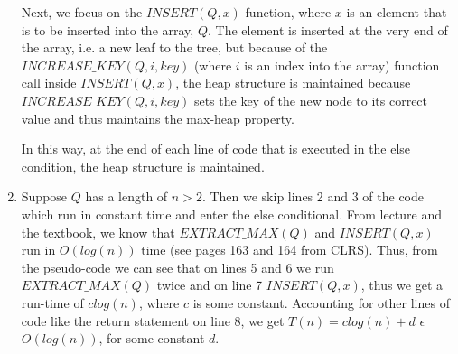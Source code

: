 \documentclass{article}
\begin{document}
\begin{enumerate}[label=(\alph*)]
Next, we focus on the $INSERT(Q,x)$ function, where $x$ is an element that is to be inserted into the array, $Q$. The element is inserted at the very end of the array, i.e. a new leaf to the tree, but because of the $INCREASE\_KEY(Q,i,key)$ (where $i$ is an index into the array) function call inside $INSERT(Q,x)$, the heap structure is maintained because $INCREASE\_KEY(Q,i,key)$ sets the key of the new node to its correct value and thus maintains the max-heap property.

In this way, at the end of each line of code that is executed in the else condition, the heap structure is maintained.

\item Suppose $Q$ has a length of $n > 2$. Then we skip lines 2 and 3 of the code which run in constant time and enter the else conditional. From lecture and the textbook, we know that $EXTRACT\_MAX(Q)$ and $INSERT(Q,x)$ run in $O(log(n))$ time (see pages 163 and 164 from CLRS). Thus, from the pseudo-code we can see that on lines 5 and 6 we run $EXTRACT\_MAX(Q)$ twice and on line 7 $INSERT(Q,x)$, thus we get a run-time of $clog(n)$, where $c$ is some constant. Accounting for other lines of code like the return statement on line 8, we get $T(n) = clog(n) + d$ $\epsilon$ $O(log(n))$, for some constant $d$.  

\end{enumerate}
\end{document}
